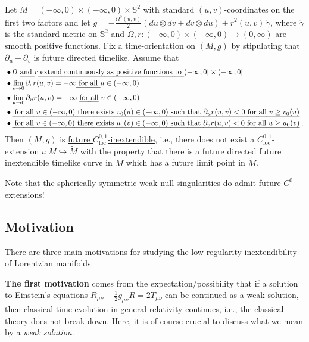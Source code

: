 \documentclass[reqno]{article}
\newcommand{\loc}{\mathrm{loc}}
\newcommand{\rd}{\partial}
\begin{document}
\begin{theorem} \label{ThmInt2}
Let $M= (-\infty, 0) \times (- \infty, 0) \times \mathbb{S}^2$ with standard $(u,v)$-coordinates on the first two factors and let $g = -\frac{\Omega^2(u,v)}{2} (du \otimes dv + dv \otimes du) + r^2(u,v) \, \mathring{\gamma}$, where $\mathring{\gamma}$ is the standard metric on $\mathbb{S}^2$ and $\Omega, r : (-\infty, 0) \times (-\infty, 0) \to (0, \infty)$ are smooth positive functions. Fix a time-orientation on $(M,g)$ by stipulating that $\rd_u + \rd_v$ is future directed timelike. Assume that 
\begin{equation*}
\begin{aligned}
&\bullet \Omega \textnormal{ \emph{and }} r \textnormal{\emph{ extend continuously as positive functions to }} (-\infty, 0] \times (-\infty, 0] \\
&\bullet \lim_{v \to 0} \rd_v r (u,v) = - \infty \textnormal{\emph{ for all }} u \in (-\infty, 0) \\
&\bullet \lim_{u \to 0} \rd_u r(u,v) = -\infty \textnormal{ \emph{for all} } v \in (-\infty, 0) \\
&\bullet \textnormal{\emph{ for all $u \in (-\infty, 0)$ there exists $v_0(u) \in (-\infty, 0)$ such that $\rd_u r(u,v) <0$ for all $v \geq v_0(u)$} }\\
&\bullet \textnormal{\emph{ for all $v \in (-\infty, 0)$ there exists $u_0(v) \in (-\infty, 0)$ such that $\rd_v r(u,v) <0$ for all $u \geq u_0(v)$}} \;.
\end{aligned}
\end{equation*}
Then $(M,g)$ is \underline{future $C^{0,1}_{\loc}$-inextendible}, i.e., there does not exist a $C^{0,1}_{\loc}$-extension $\iota : M \hookrightarrow \tilde{M}$ with the property that there is a future directed future inextendible timelike curve in $M$ which has a future limit point in $\tilde{M}$.
\end{theorem}
Note that the spherically symmetric weak null singularities do admit future $C^0$-extensions!


\subsection{Motivation}

There are three main motivations for studying the low-regularity inextendibility of Lorentzian manifolds. 

\textbf{The first motivation} comes from the expectation/possibility that if a solution to Einstein's equations $R_{\mu \nu} - \frac{1}{2} g_{\mu \nu} R = 2 T_{\mu \nu}$ can be continued as a weak solution, then classical time-evolution in general relativity continues, i.e., the classical theory does not break down.  Here, it is of course crucial to discuss what we mean by a \emph{weak solution}.
\end{document}
